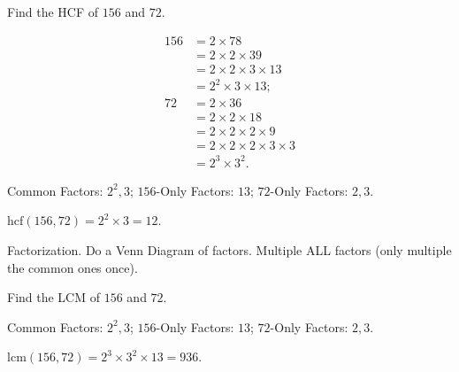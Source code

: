 \documentclass[8pt]{article}
\begin{document}
		\prob Find the HCF of \(156\) and \(72\).
		
		\solution 
		
		\begin{align*}
			156 &= 2 \times 78\\
			    &= 2 \times 2 \times 39\\
				&= 2 \times 2 \times 3 \times 13\\
				&= 2^2 \times 3 \times 13;\\
			72 &= 2 \times 36\\
			   &= 2 \times 2 \times 18\\
			   &= 2 \times 2 \times 2 \times 9\\
			   &= 2 \times 2 \times 2 \times 3 \times 3\\
			   &= 2^3 \times 3^2.
		\end{align*}

		Common Factors: \(2^2, 3\); \(156\)-Only Factors: \(13\); \(72\)-Only Factors: \(2, 3\).

		\(\mathrm{hcf}(156, 72) = 2^2 \times 3 = 12\).\newline

		\meth {} Factorization. Do a Venn Diagram of factors. Multiple ALL factors (only multiple the common ones once).\newline
		
		\prob Find the LCM of \(156\) and \(72\).
		
		\solution Common Factors: \(2^2, 3\); \(156\)-Only Factors: \(13\); \(72\)-Only Factors: \(2, 3\).
		
		\(\mathrm{lcm}(156, 72)=2^3 \times 3^2 \times 13 = 936\).
\end{document}
